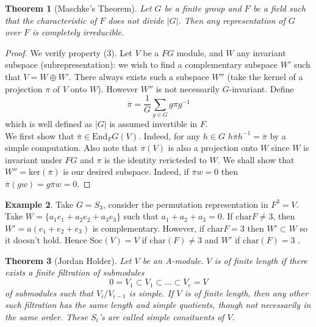 \documentclass{article}
\newtheorem{theorem}{Theorem}[section]
\theoremstyle{definition}
\newtheorem{example}[theorem]{Example}
\theoremstyle{remark}
\theoremstyle{plain}
\begin{document}
\begin{theorem}[Maschke's Theorem]
	Let $G$ be a finite group and $F$ be a field such that the characteristic of $F$ does not divide $|G|$.
	Then any representation of $G$ over $F$ is completely irreducible.
\end{theorem}
\begin{proof}
	We verify property (3).
	Let $V$ be a $FG$ module, and $W$ any invariant subspace (subrepresentation): we wish to find a complementary subspace $W'$ such that $V = W \oplus W'$.
	There always exists such a subspace $W''$ (take the kernel of a projection $\pi$ of $V$ onto $W$).
	However $W''$ is not necessarily $G$-invariant.
	Define 
	\[ \overline{\pi} = \frac{1}{{G}} \sum_{g \in G} g \pi g^{-1}\]
which is well defined as $|G|$ is assumed invertible in $F$. \\

We first show that $\overline{\pi} \in \text{End}_FG(V)$. Indeed, for any $h \in G$ $h \overline{\pi} h^{-1} = \overline{\pi}$ by a simple computation.
Also note that $\overline{\pi}(V)$ is also a projection onto $W$ since $W$ is invariant under $FG$ and $\pi$ is the identity rericteded to $W$.
We shall show that $W'' = \text{ker}(\overline{\pi})$ is our desired subspace. 
Indeed, if $\overline{\pi}w = 0$ then $\overline{\pi}(gw) = g \overline{\pi} w = 0$.
\end{proof}

\begin{example}
	Take $G = S_3$, consider the permutation representation in $F^3 = V$.
	Take $W = \{a_1e_1  + a_2e_2 + a_3e_3\}$ such that $a_1 + a_2 + a_3 = 0$.
	If $\text{char} F \neq 3$, then $W' = a(e_1 + e_2 + e_3)$ is complementary.
	However, if $\text{char} F = 3$ then $W' \subset W$ so it doesn't hold.
	Hence $\text{Soc}(V) = V$ if $\text{char}(F) \neq 3$ and $W'$ if $\text{char}(F) = 3$ .
\end{example}

\begin{theorem}[Jordan Holder]
	Let $V$ be an $A$-module. $V$ is of finite length if there exists a finite filtration of submodules 
	\[0 = V_1 \subset V_1 \subset \dots \subset V_e = V\]
	of submodules such that $V_i/V_{i-1}$ is simple. 
	If $V$ is of finite length, then any other such filtration has the same length and simple quotients, though not necessarily in the same order.
	These $S_i$'s are called \textit{simple consituents} of $V$.
\end{theorem}
\end{document}
